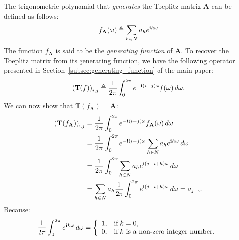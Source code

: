 The trigonometric polynomial that {\em generates} the Toeplitz matrix $\mathbf{A}$ can be defined as follows:
\begin{equation}
    f_{\mathbf{A}}(\omega) \triangleq \sum_{h \in N} a_h e^{\mathbf{i} h \omega}
\end{equation}
The function $f_{\mathbf{A}}$ is said to be the \emph{generating function} of $\mathbf{A}$. To recover the Toeplitz matrix from its generating function, we have the following operator presented in Section~\ref{subsec:generating_function} of the main paper:
\begin{equation} \label{appendix-eq:toeplitz_operator}
    \leftmat \mathbf{T}(f) \rightmat_{i, j} \triangleq  \frac{1}{2\pi} \int_0^{2\pi} e^{-\ci (i - j)\omega} f(\omega) \,d\omega .
\end{equation}
We can now show that $\mathbf{T}(f_{\mathbf{A}}) = \mathbf{A}$: 
\begin{align}
    \leftmat \mathbf{T}(f_\mathbf{A}) \rightmat_{i, j} &= \frac{1}{2\pi} \int_0^{2\pi} e^{-\ci (i-j)\omega} f_{\mathbf{A}}(\omega) \,d\omega  \\
    &= \frac{1}{2\pi} \int_0^{2\pi} e^{-\ci (i-j) \omega} \sum_{h \in N} a_h e^{\ci h \omega} \,d\omega  \\
    &= \frac{1}{2\pi} \int_0^{2\pi} \sum_{h \in N} a_h e^{\ci (j - i + h) \omega} \,d\omega  \\
    &= \sum_{h \in N} a_h \frac{1}{2\pi} \int_0^{2\pi} e^{\ci (j - i + h) \omega} \,d\omega 
    = a_{j-i} .
\end{align}
Because:
\begin{equation}
    \frac{1}{2\pi} \int_0^{2\pi} e^{\ci k \omega} \,d\omega = \left\{
                \begin{array}{ll}
                  1, & \text{if}\ k = 0, \\
                  0, & \text{if}\ k\ \text{is a non-zero integer number.}
                \end{array}
                \right.
\end{equation}

